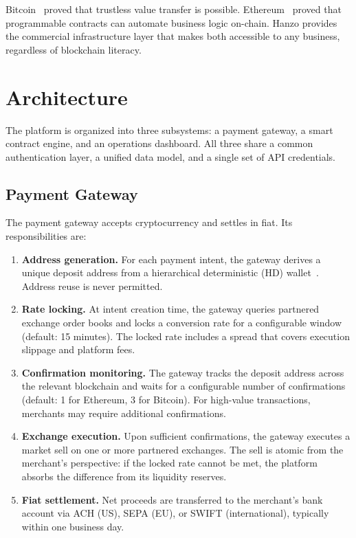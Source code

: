 \documentclass[11pt,letterpaper]{article}
\begin{document}
Bitcoin~\cite{nakamoto2008} proved that trustless value transfer is possible.
Ethereum~\cite{buterin2014} proved that programmable contracts can automate
business logic on-chain.  Hanzo provides the commercial infrastructure layer
that makes both accessible to any business, regardless of blockchain literacy.

\section{Architecture}
\label{sec:architecture}

The platform is organized into three subsystems: a payment gateway, a smart
contract engine, and an operations dashboard.  All three share a common
authentication layer, a unified data model, and a single set of API
credentials.

\subsection{Payment Gateway}

The payment gateway accepts cryptocurrency and settles in fiat.  Its
responsibilities are:

\begin{enumerate}[leftmargin=1.1em]
    \item \textbf{Address generation.}  For each payment intent, the gateway
    derives a unique deposit address from a hierarchical deterministic (HD)
    wallet~\cite{bip32}.  Address reuse is never permitted.
    \item \textbf{Rate locking.}  At intent creation time, the gateway queries
    partnered exchange order books and locks a conversion rate for a
    configurable window (default: 15 minutes).  The locked rate includes a
    spread that covers execution slippage and platform fees.
    \item \textbf{Confirmation monitoring.}  The gateway tracks the deposit
    address across the relevant blockchain and waits for a configurable number
    of confirmations (default: 1 for Ethereum, 3 for Bitcoin).  For
    high-value transactions, merchants may require additional confirmations.
    \item \textbf{Exchange execution.}  Upon sufficient confirmations, the
    gateway executes a market sell on one or more partnered exchanges.  The
    sell is atomic from the merchant's perspective: if the locked rate cannot
    be met, the platform absorbs the difference from its liquidity reserves.
    \item \textbf{Fiat settlement.}  Net proceeds are transferred to the
    merchant's bank account via ACH (US), SEPA (EU), or SWIFT (international),
    typically within one business day.
\end{enumerate}
\end{document}
